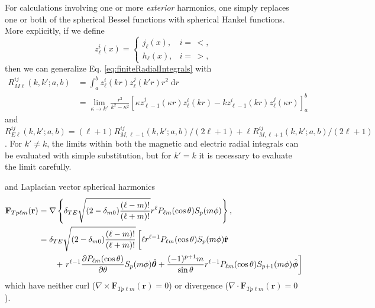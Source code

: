 For calculations involving one or more \textit{exterior} harmonics, one simply replaces one or both of the spherical Bessel functions with spherical Hankel functions. More explicitly, if we define 
\begin{equation}
z_\ell^i(x) = 
\begin{cases}
j_\ell(x), & i = \,<,\\
h_\ell(x), & i = \,>,
\end{cases}
\end{equation}
then we can generalize Eq. \eqref{eq:finiteRadialIntegrals} with
\begin{equation}
\begin{split}
R_{M\ell}^{ij}(k,k';a,b) &= \int_a^bz_\ell^i(kr)z_\ell^j(k'r)r^2\;\mathrm{d}r\\
&= \lim_{\kappa\to k'}\frac{r^2}{k^2 - \kappa^2}\left[\kappa z_{\ell-1}^j(\kappa r)z_{\ell}^i(kr) - kz_{\ell-1}^i(kr)z_{\ell}^j(\kappa r)\right]_a^b
\end{split}
\end{equation}
and $R_{E\ell}^{ij}(k,k';a,b) = (\ell+1)R_{M,\ell - 1}^{ij}(k,k';a,b)/(2\ell + 1) + \ell R_{M,\ell + 1}^{ij}(k,k';a,b)/(2\ell + 1)$. For $k'\neq k$, the limits within both the magnetic and electric radial integrals can be evaluated with simple substitution, but for $k'=k$ it is necessary to evaluate the limit carefully.




and Laplacian vector spherical harmonics
\begin{equation}
\begin{split}
\mathbf{F}_{Tp\ell m}(\mathbf{r}) &= \nabla\left\{\delta_{TE}\sqrt{(2 - \delta_{m0})\frac{(\ell - m)!}{(\ell + m)!}}r^\ell P_{\ell m}(\cos\theta)S_p(m\phi)\right\},\\
&= \delta_{TE}\sqrt{(2 - \delta_{m0})\frac{(\ell - m)!}{(\ell + m)!}}\left[ \vphantom{\frac{(-1)^{p+1}}{\sin\theta}} \ell r^{\ell - 1}P_{\ell m}(\cos\theta)S_p(m\phi)\hat{\mathbf{r}}\right.\\
&\qquad+ \left. r^{\ell - 1}\frac{\partial P_{\ell m}(\cos\theta)}{\partial \theta}S_p(m\phi)\hat{\bm{\theta}} + \frac{(-1)^{p+1}m}{\sin\theta}r^{\ell - 1}P_{\ell m}(\cos\theta)S_{p+1}(m\phi)\hat{\bm{\phi}} \right]
\end{split}
\end{equation}
which have neither curl ($\nabla\times\mathbf{F}_{Tp\ell m}(\mathbf{r}) = 0$) or divergence ($\nabla\cdot\mathbf{F}_{Tp\ell m}(\mathbf{r}) = 0$). 

